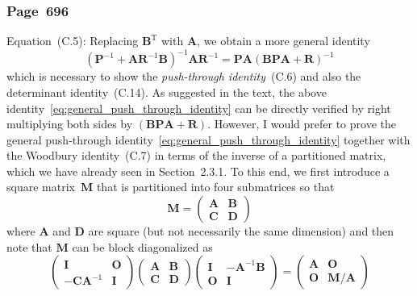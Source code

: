 \documentclass[12pt,a4paper]{article}
\newcommand{\erratum}[1]{\subsubsection*{#1}}
\begin{document}
\erratum{Page~696}
Equation~(C.5):
Replacing $\mathbf{B}^{\operatorname{T}}$ with $\mathbf{A}$, we obtain a more general identity
\begin{equation}
\left( \mathbf{P}^{-1} + \mathbf{A}\mathbf{R}^{-1}\mathbf{B} \right)^{-1}
\mathbf{A}\mathbf{R}^{-1}
=
\mathbf{P}\mathbf{A}
\left( \mathbf{B}\mathbf{P}\mathbf{A} + \mathbf{R} \right)^{-1}
\label{eq:general_push_through_identity}
\end{equation}
which is necessary to show the \emph{push-through identity}~(C.6) and also
the determinant identity~(C.14).
As suggested in the text,
the above identity~\eqref{eq:general_push_through_identity} can be
directly verified by right multiplying both sides by
$\left( \mathbf{B}\mathbf{P}\mathbf{A} + \mathbf{R} \right)$.
However, I would prefer to prove
the general push-through identity~\eqref{eq:general_push_through_identity}
together with the Woodbury identity~(C.7) in terms of the inverse of a partitioned matrix,
which we have already seen in Section~2.3.1.
To this end, we first introduce a square matrix~$\mathbf{M}$ that is partitioned into
four submatrices so that
\begin{equation}
\mathbf{M} =
\begin{pmatrix}
\mathbf{A} & \mathbf{B} \\
\mathbf{C} & \mathbf{D}
\end{pmatrix}
\end{equation}
where $\mathbf{A}$ and $\mathbf{D}$ are square (but not necessarily the same dimension)
and then note that $\mathbf{M}$ can be block diagonalized as
\begin{equation}
\begin{pmatrix}
\mathbf{I} & \mathbf{O} \\
-\mathbf{C}\mathbf{A}^{-1} & \mathbf{I}
\end{pmatrix}
\begin{pmatrix}
\mathbf{A} & \mathbf{B} \\
\mathbf{C} & \mathbf{D}
\end{pmatrix}
\begin{pmatrix}
\mathbf{I} & -\mathbf{A}^{-1}\mathbf{B} \\
\mathbf{O} & \mathbf{I}
\end{pmatrix}
=
\begin{pmatrix}
\mathbf{A} & \mathbf{O} \\
\mathbf{O} & \mathbf{M}/\mathbf{A}
\end{pmatrix}
\label{eq:block_diagonalization_of_partitioned_matrix_with_Schur_complement_wrt_A}
\end{equation}
\end{document}
